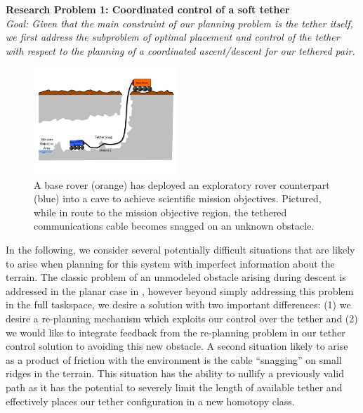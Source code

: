 \documentclass[12pt]{article}
\begin{document}
{\bf Research Problem 1: Coordinated control of a soft tether \\}
{\sl Goal: Given that the main constraint of our planning problem is the tether itself, we first 
address the subproblem of optimal placement and control of the tether with respect to the planning of 
a coordinated ascent/descent for our tethered pair. }
\begin{figure}
  \begin{center}
    \vspace{-0.5in}
    \includegraphics[width=0.48\textwidth, right]{cave_exploration}
  \end{center}
  \vspace{-0.5in}
  \label{fig:cave}
  \caption{A base rover (orange) has deployed an exploratory rover counterpart (blue) into a cave to achieve scientific mission objectives. Pictured, while in route to the mission objective region, the tethered communications cable becomes snagged on an unknown obstacle.}
\end{figure}
\vspace{-0.15in}



In the following, we consider several potentially difficult situations that are likely 
to arise when planning for this system with imperfect information about the terrain. The classic problem 
of an unmodeled obstacle arising during descent is addressed in the planar case in \cite{axel_online}, however beyond 
simply addressing this problem in the full taskspace, we 
desire a solution with two important differences: (1) we desire a re-planning mechanism which exploits 
our control over the tether and (2) we would like to integrate feedback from the re-planning problem 
in our tether control solution to avoiding this new obstacle. A second situation likely to arise as a product 
of friction with the environment is the cable ``snagging'' on small ridges in the terrain. This situation 
has the ability to nullify a previously valid path as it has the potential to severely limit the length 
of available tether and effectively places our tether configuration in a new homotopy class.
\end{document}
